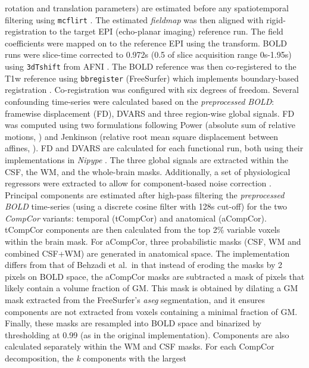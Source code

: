 \documentclass[
]{article}
\begin{document}
\begin{description}
rotation and translation parameters) are estimated before any
spatiotemporal filtering using \texttt{mcflirt} \citep[FSL
6.0.5.1:57b01774,][]{mcflirt}. The estimated \emph{fieldmap} was then
aligned with rigid-registration to the target EPI (echo-planar imaging)
reference run. The field coefficients were mapped on to the reference
EPI using the transform. BOLD runs were slice-time corrected to 0.972s
(0.5 of slice acquisition range 0s-1.95s) using \texttt{3dTshift} from
AFNI \citep[RRID:SCR\_005927]{afni}. The BOLD reference was then
co-registered to the T1w reference using \texttt{bbregister}
(FreeSurfer) which implements boundary-based registration \citep{bbr}.
Co-registration was configured with six degrees of freedom. Several
confounding time-series were calculated based on the \emph{preprocessed
BOLD}: framewise displacement (FD), DVARS and three region-wise global
signals. FD was computed using two formulations following Power
(absolute sum of relative motions, \citet{power_fd_dvars}) and Jenkinson
(relative root mean square displacement between affines,
\citet{mcflirt}). FD and DVARS are calculated for each functional run,
both using their implementations in \emph{Nipype} \citep[following the
definitions by][]{power_fd_dvars}. The three global signals are
extracted within the CSF, the WM, and the whole-brain masks.
Additionally, a set of physiological regressors were extracted to allow
for component-based noise correction \citep[\emph{CompCor},][]{compcor}.
Principal components are estimated after high-pass filtering the
\emph{preprocessed BOLD} time-series (using a discrete cosine filter
with 128s cut-off) for the two \emph{CompCor} variants: temporal
(tCompCor) and anatomical (aCompCor). tCompCor components are then
calculated from the top 2\% variable voxels within the brain mask. For
aCompCor, three probabilistic masks (CSF, WM and combined CSF+WM) are
generated in anatomical space. The implementation differs from that of
Behzadi et al.~in that instead of eroding the masks by 2 pixels on BOLD
space, the aCompCor masks are subtracted a mask of pixels that likely
contain a volume fraction of GM. This mask is obtained by dilating a GM
mask extracted from the FreeSurfer's \emph{aseg} segmentation, and it
ensures components are not extracted from voxels containing a minimal
fraction of GM. Finally, these masks are resampled into BOLD space and
binarized by thresholding at 0.99 (as in the original implementation).
Components are also calculated separately within the WM and CSF masks.
For each CompCor decomposition, the \emph{k} components with the largest

\end{description}
\end{document}
